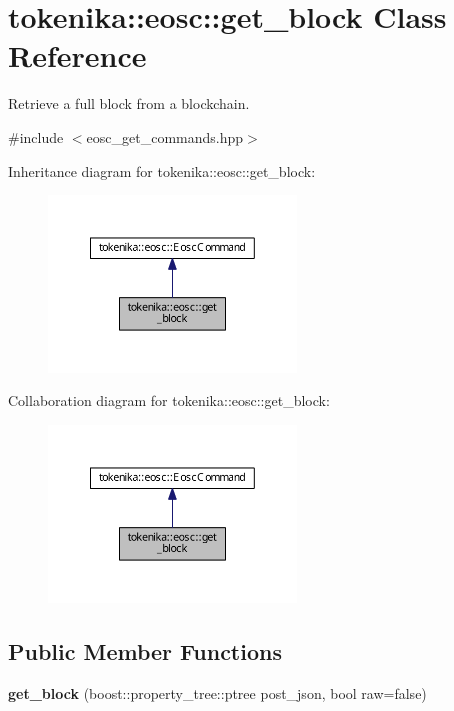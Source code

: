 \hypertarget{classtokenika_1_1eosc_1_1get__block}{}\section{tokenika\+:\+:eosc\+:\+:get\+\_\+block Class Reference}
\label{classtokenika_1_1eosc_1_1get__block}


Retrieve a full block from a blockchain.  




{\ttfamily \#include $<$eosc\+\_\+get\+\_\+commands.\+hpp$>$}



Inheritance diagram for tokenika\+:\+:eosc\+:\+:get\+\_\+block\+:\nopagebreak
\begin{figure}[H]
\begin{center}
\leavevmode
\includegraphics[width=187pt]{classtokenika_1_1eosc_1_1get__block__inherit__graph}
\end{center}
\end{figure}


Collaboration diagram for tokenika\+:\+:eosc\+:\+:get\+\_\+block\+:\nopagebreak
\begin{figure}[H]
\begin{center}
\leavevmode
\includegraphics[width=187pt]{classtokenika_1_1eosc_1_1get__block__coll__graph}
\end{center}
\end{figure}
\subsection*{Public Member Functions}
\begin{DoxyCompactItemize}
\item 
\mbox{\label{classtokenika_1_1eosc_1_1get__block_a8d6bd95d65d6bd8265dc3fb23e5e0350}} 
{\bfseries get\+\_\+block} (boost\+::property\+\_\+tree\+::ptree post\+\_\+json, bool raw=false)
\end{DoxyCompactItemize}
